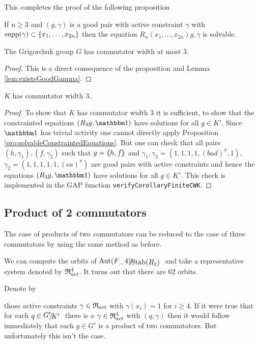 \documentclass[a4paper,12pt]{article}
\begin{document}
This completes the proof of the following proposition
\begin{pro}\label{pro:solvableConstraintedEquations}
 If $n\geq3$ and $(g,\gamma)$ is a good pair with active constraint $\gamma$ with $\textup{supp}(\gamma)\subset\{x_1,\ldots,x_{2n}\}$
 then the equation $R_n(x_1,\ldots,x_{2n})g,\gamma$ is solvable. 
\end{pro}
\begin{cor}
 The Grigorchuk group $G$ has commutator width at most $3$.
\end{cor}
\begin{proof}
 This is a direct consequence of the proposition and Lemma \ref{lem:existsGoodGamma}.
\end{proof}


\begin{cor}
 $K$ has commutator width $3$. 
\end{cor}
\begin{proof}
 To show that $K$ has commutator width $3$ it is sufficient, to show that the constrainted equations $(R_3g,\id)$ have solutions for all $g\in K'$. 
 Since $\id$ has trivial activity one cannot directly apply Proposition \ref{pro:solvableConstraintedEquations}.
 But one can check that all pairs $(h,\gamma_1),(f,\gamma_2)$
 such that $g=\langle\negthickspace\langle h,f\rangle\negthickspace\rangle$ and $\gamma_1,\gamma_2=(1,1,1,1,(bad)^\pi,1)$, $\gamma_2=(1,1,1,1,1,(ca)^\pi)$
 are good pairs with active constraints and hence the equations $(R_3g,\id)$ have solutions for all $g\in K'$. 
 This check is implemented in the GAP function \lstinline{verifyCorollaryFiniteCWK}. 
\end{proof}

\subsection{Product of 2 commutators}
The case of products of two commutators can be reduced to the case of three commutators by using the same method as before.

We can compute the orbits of $\RNK{\Aut(F\_4)}{\Stab(R_2)}$ and take a representative system denoted by $\mathfrak{R}^4_{act}$.
It turns out that there are $62$ orbits. 

Denote by 

 those active constraints $\gamma\in\mathfrak{R}_{act}$ with $\gamma(x_i)=1$ for $i\geq 4$.
If it were true that for each $q\in\RNK{G'}{K'}$ there is a $\gamma\in\mathfrak{R}_{act}^4$ with $(q,\gamma)$ 
then it would follow immediately that each $g\in G'$ is a product of two commutators. But unfortunately 
this isn't the case.
\end{document}
